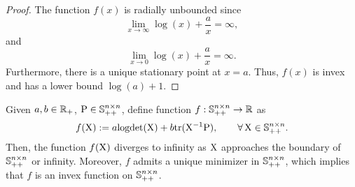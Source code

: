 \begin{proof}
    The function $f(x)$ is radially unbounded since
    \begin{equation}
        \lim_{x \to \infty} \log(x) + \frac{a} {x} = \infty,
    \end{equation}
    and
    \begin{equation}
        \lim_{x \to 0} \log(x) + \frac{a} {x} = \infty.
    \end{equation}
    Furthermore, there is a unique stationary point at $x=a$. Thus, $f(x)$ is invex and has a lower bound $\log(a) + 1$.
\end{proof}

\begin{lemma}\label{lem:invexity_logdet_trinv}
    Given $a,b \in {\mathbb{R}}_{+}$, ${ \mathrm{P} }\in {\mathbb{S}}_{++}^{n\times n}$, 
    define function $f:{\mathbb{S}}_{++}^{n \times n}\to {\mathbb{R}}$ as    
    \begin{equation}
        f({ \mathrm{X} }) := a\mathrm{logdet}({ \mathrm{X} }) + b\mathrm{tr}({ \mathrm{X} }^{-1}{ \mathrm{P} }), \qquad \forall\, { \mathrm{X} }\in{\mathbb{S}}_{++}^{n\times n}.
    \end{equation}
    Then, the function $f({ \mathrm{X} })$ diverges to infinity as ${ \mathrm{X} }$ approaches the boundary of ${\mathbb{S}}_{++}^{n \times n}$ or infinity. 
    Moreover, $f$ admits a unique minimizer in ${\mathbb{S}}_{++}^{n \times n}$, which implies that $f$ is an invex function on ${\mathbb{S}}_{++}^{n \times n}$.    
\end{lemma}
